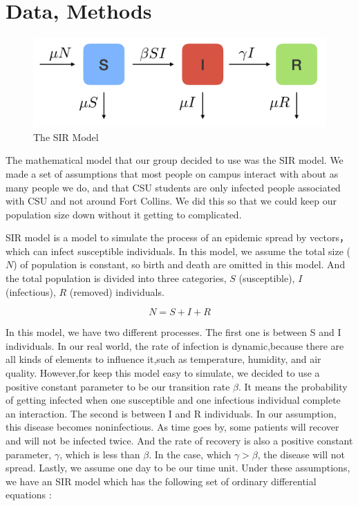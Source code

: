 \documentclass[12pt]{article}
\begin{document}
\section{Data, Methods}

\begin{figure}[H]
    \centering
    \includegraphics[width=0.6\linewidth]{flow.png}
    \caption{The SIR Model}
\end{figure}

The mathematical model that our group decided to use was the SIR model. We made a set of assumptions that most people on campus interact with about as many people we do, and that CSU students are only infected people associated with CSU and not around Fort Collins. We did this so that we could keep our population size down without it getting to complicated. 

SIR model is a model to simulate the process of an epidemic spread by vectors，which can infect susceptible individuals. In this model, we assume the total size ($N$) of population is constant, so birth and death are omitted in this model. And the total population is divided into three categories, $S$ (susceptible), $I$ (infectious), $R$ (removed) individuals.

\begin{equation}
    N=S+I+R  \label{A}
\end{equation}

In this model, we have two different processes. The first one is between S and I individuals. In our real world, the rate of infection is dynamic,because there are all kinds of elements to influence it,such as temperature, humidity, and air quality. However,for keep this model easy to simulate, we decided to use a positive constant parameter to be our transition rate $\beta$. It means the probability of getting infected when one susceptible and one infectious individual complete an interaction. The second is between I and R individuals. In our assumption, this disease becomes noninfectious. As time goes by, some patients will recover and will not be infected twice. And the rate of recovery is also a positive constant parameter, $\gamma$, which is less than $\beta$. In the case, which $\gamma > \beta$, the disease will not spread. Lastly, we assume one day to be our time unit. Under these assumptions, we have an SIR model which has the following set of ordinary differential equations \cite{hethcote2000mathematics}:
\end{document}
